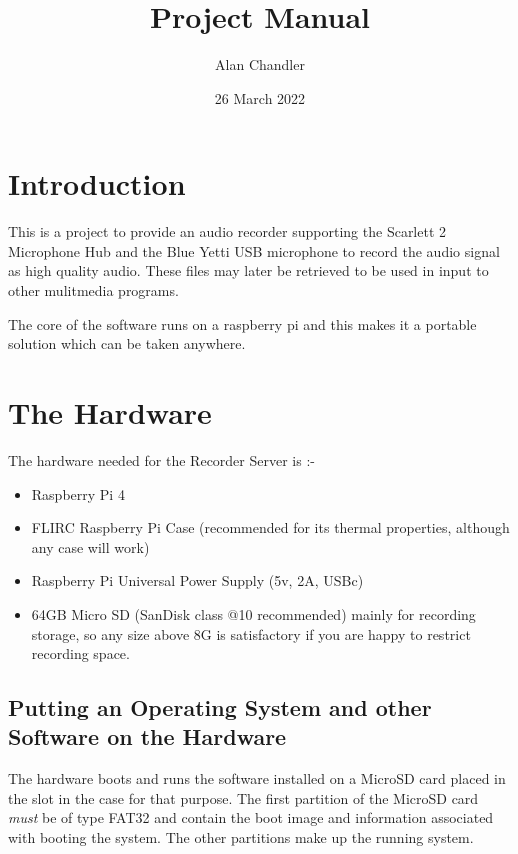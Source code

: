 \documentclass[Draft]{akc}
\author{Alan Chandler}
\title{Project Manual}
\date{26 March 2022}
\begin{document}
\maketitle
{}
\tableofcontents
\section{Introduction}

This is a project to provide an audio recorder supporting the Scarlett 2 Microphone Hub and the Blue Yetti USB microphone to record the audio
signal as high quality audio. These files may later be retrieved to be used in input to other mulitmedia programs.

The core of the software runs on a raspberry pi and this makes it a portable solution which can be taken anywhere.

\section{The Hardware}

The hardware needed for the Recorder Server is :-

\begin{itemize}
\item Raspberry Pi 4
\item FLIRC Raspberry Pi Case (recommended for its thermal properties, although any case will work)
\item Raspberry Pi Universal Power Supply (5v, 2A, USBc)
\item 64GB Micro SD (SanDisk class @10 recommended) mainly for recording storage, so any size above 8G is satisfactory if you are happy to restrict recording space.
\end{itemize}

\subsection{Putting an Operating System and other Software on the Hardware}

The hardware boots and runs the software installed on a MicroSD card placed in the slot in the case
for that purpose.  The first partition of the MicroSD card \emph{must} be of type FAT32 and contain
the boot image and information associated with booting the system.  The other partitions make up the
running system.
\end{document}
